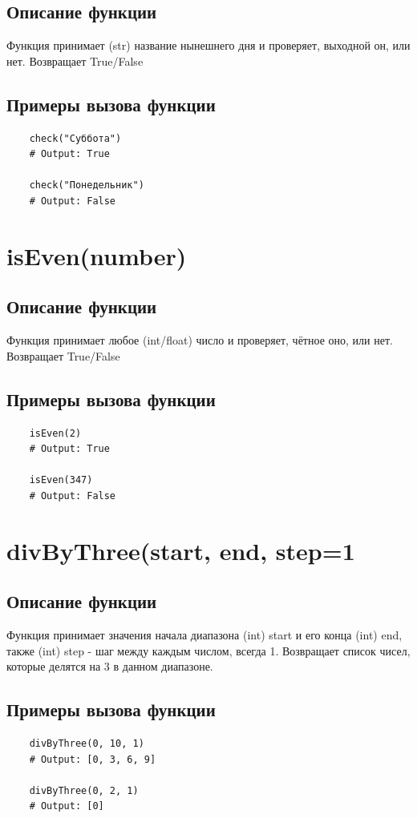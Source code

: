\documentclass{article}
\begin{document}
\subsection{Описание функции}
Функция принимает (str) название нынешнего дня и проверяет, выходной он, или нет.
Возвращает True/False

\subsection{Примеры вызова функции}
\begin{verbatim}
    check("Суббота")
    # Output: True

    check("Понедельник")
    # Output: False
\end{verbatim}

\section{isEven(number)}
\subsection{Описание функции}
Функция принимает любое (int/float) число и проверяет, чётное оно, или нет.
Возвращает True/False
\subsection{Примеры вызова функции}
\begin{verbatim}
    isEven(2)
    # Output: True

    isEven(347)
    # Output: False
\end{verbatim}

\section{divByThree(start, end, step=1}
\subsection{Описание функции}
Функция принимает значения начала диапазона (int) start и его конца (int) end, также (int) step - шаг между каждым числом, всегда 1.
Возвращает список чисел, которые делятся на 3 в данном диапазоне.

\subsection{Примеры вызова функции}
\begin{verbatim}
    divByThree(0, 10, 1)
    # Output: [0, 3, 6, 9]

    divByThree(0, 2, 1)
    # Output: [0]
\end{verbatim}
\end{document}
